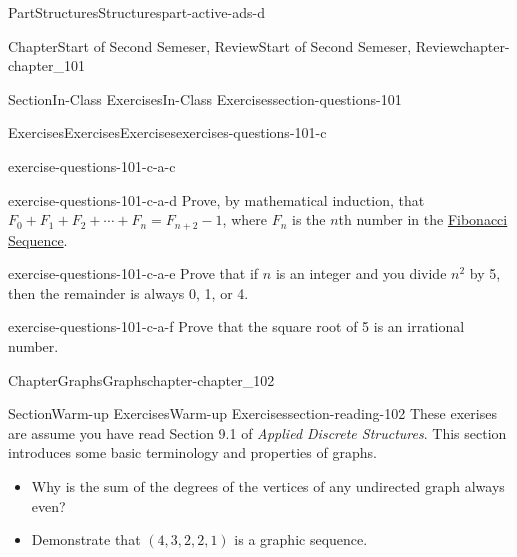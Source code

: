 \documentclass[oneside,10pt,]{book}
\numberwithin{equation}{section}
\begin{document}
\begin{partptx}{Part}{Structures}{}{Structures}{}{}{part-active-ads-d}
\begin{chapterptx}{Chapter}{Start of Second Semeser, Review}{}{Start of Second Semeser, Review}{}{}{chapter-chapter_101}
\begin{sectionptx}{Section}{In-Class Exercises}{}{In-Class Exercises}{}{}{section-questions-101}
\begin{exercises-subsection-numberless}{Exercises}{Exercises}{}{Exercises}{}{}{exercises-questions-101-c}
\begin{exercisegroup}
\begin{divisionexerciseeg}{3}{}{}{exercise-questions-101-c-a-c}
\begin{quote}
\end{quote}
\end{divisionexerciseeg}%
\begin{divisionexerciseeg}{4}{}{}{exercise-questions-101-c-a-d}%
Prove, by mathematical induction, that \(F_0 + F_1 + F_2 + \cdots + F_{n} = F_{n+2} - 1\), where \(F_n\) is the \(n\)th number in the \hyperref[section-def-fibonacci-sequence]{Fibonacci Sequence}.%
\end{divisionexerciseeg}%
\begin{divisionexerciseeg}{5}{}{}{exercise-questions-101-c-a-e}%
Prove that if \(n\) is an integer and you divide \(n^2\) by 5, then the remainder is always 0, 1, or 4.%
\end{divisionexerciseeg}%
\begin{divisionexerciseeg}{6}{}{}{exercise-questions-101-c-a-f}%
Prove that the square root of 5 is an irrational number.%
\end{divisionexerciseeg}%
\end{exercisegroup}
\par\medskip\noindent
\end{exercises-subsection-numberless}
\end{sectionptx}
\end{chapterptx}
%
\typeout{************************************************}
\typeout{************************************************}
%
\begin{chapterptx}{Chapter}{Graphs}{}{Graphs}{}{}{chapter-chapter_102}
\renewcommand*{\chaptername}{Chapter}
%
%
%
\typeout{************************************************}
\typeout{************************************************}
%
\begin{sectionptx}{Section}{Warm-up Exercises}{}{Warm-up Exercises}{}{}{section-reading-102}
These exerises are assume you have read Section 9.1 of \emph{Applied Discrete Structures}. This section introduces some basic terminology and properties of graphs.%
\par
%
\begin{itemize}[label=\textbullet]
\item{}Why is the sum of the degrees of the vertices of any undirected graph always even?%
\item{}Demonstrate that \((4,3,2,2,1)\) is a graphic sequence.%
\end{itemize}
%
\end{sectionptx}
%
%
\typeout{************************************************}

\end{chapterptx}
\end{partptx}
\end{document}
